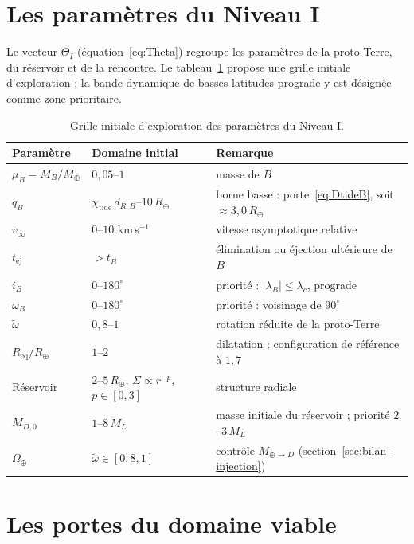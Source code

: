 \documentclass[11pt,a4paper,openany]{report}
\newcommand{\Mt}{M_{\oplus}}
\newcommand{\Rt}{R_{\oplus}}
\newcommand{\Req}{R_{\mathrm{eq}}}
\begin{document}
\section{Les paramètres du Niveau I}

Le vecteur $\Theta_I$ (équation~\eqref{eq:Theta}) regroupe les paramètres de la proto-Terre, du
réservoir et de la rencontre. Le tableau~\ref{tab:grille} propose une grille initiale d'exploration ;
la bande dynamique de basses latitudes prograde y est désignée comme zone prioritaire.

\begin{table}[htbp]
\centering
\small
\caption{Grille initiale d'exploration des paramètres du Niveau I.}
\label{tab:grille}
\begin{tabular}{lll}
\toprule
\textbf{Paramètre} & \textbf{Domaine initial} & \textbf{Remarque} \\
\midrule
$\mu_B=M_B/\Mt$ & $0{,}05$--$1$ & masse de $B$ \\
$q_B$ & $\chi_{\mathrm{tide}}\,d_{R,B}$--$10\,\Rt$ & borne basse : porte~\eqref{eq:DtideB}, soit $\approx3{,}0\,\Rt$ \\
$v_\infty$ & $0$--$10$ km\,s$^{-1}$ & vitesse asymptotique relative \\
$t_{\mathrm{ej}}$ & $>t_B$ & élimination ou éjection ultérieure de $B$ \\
$i_B$ & $0$--$180^\circ$ & priorité : $|\lambda_B|\le\lambda_c$, prograde \\
$\omega_B$ & $0$--$180^\circ$ & priorité : voisinage de $90^\circ$ \\
$\tilde\omega$ & $0{,}8$--$1$ & rotation réduite de la proto-Terre \\
$\Req/\Rt$ & $1$--$2$ & dilatation ; configuration de référence à $1{,}7$ \\
Réservoir & $2$--$5\,\Rt$, $\Sigma\propto r^{-p}$, $p\in[0,3]$ & structure radiale \\
$M_{D,0}$ & $1$--$8\,M_L$ & masse initiale du réservoir ; priorité $2$--$3\,M_L$ \\
$\Omega_\oplus$ & $\tilde\omega\in[0{,}8,1]$ & contrôle $M_{\oplus\to D}$ (section~\ref{sec:bilan-injection}) \\
\bottomrule
\end{tabular}
\end{table}

\section{Les portes du domaine viable}
\end{document}

